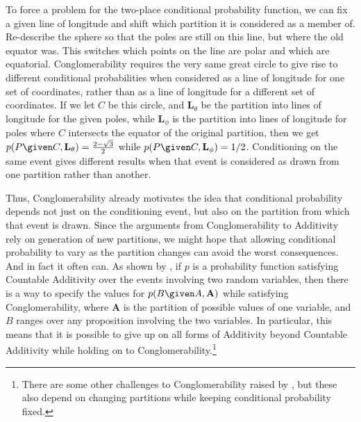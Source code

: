 To force a problem for the two-place conditional probability function, we can fix a given line of longitude and shift which partition it is considered as a member of. Re-describe the sphere so that the poles are still on this line, but where the old equator was. This switches which points on the line are polar and which are equatorial. Conglomerability requires the very same great circle to give rise to different conditional probabilities when considered as a line of longitude for one set of coordinates, rather than as a line of longitude for a different set of coordinates. If we let $C$ be this circle, and $\mathbf{L}_\theta$ be the partition into lines of longitude for the given poles, while $\mathbf{L}_\phi$ is the partition into lines of longitude for poles where $C$ intersects the equator of the original partition, then we get $p(P \given C,\mathbf{L}_\theta)=\frac{2-\sqrt 3}{2}$ while $p(P \given C,\mathbf{L}_\phi)=1/2$. Conditioning on the same event gives different results when that event is considered as drawn from one partition rather than another.

Thus, Conglomerability already motivates the idea that conditional probability depends not just on the conditioning event, but also on the partition from which that event is drawn. Since the arguments from Conglomerability to Additivity rely on generation of new partitions, we might hope that allowing conditional probability to vary as the partition changes can avoid the worst consequences. And in fact it often can. As shown by \citet[Theorem 33.3]{billingsley}, if $p$ is a probability function satisfying Countable Additivity over the events involving two random variables, then there is a way to specify the values for $p(B \given A,\mathbf{A})$ while satisfying Conglomerability, where $\mathbf{A}$ is the partition of possible values of one variable, and $B$ ranges over any proposition involving the two variables. In particular, this means that it is possible to give up on all forms of Additivity beyond Countable Additivity while holding on to Conglomerability.\footnote{There are some other challenges to Conglomerability raised by \citet{binding}, but these also depend on changing partitions while keeping conditional probability fixed.}


